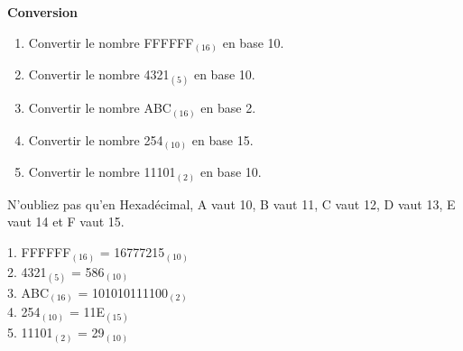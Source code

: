 \begin{Exercice}[10 minutes]  \textbf{Conversion }\\
    \begin{enumerate}
        \item Convertir le nombre FFFFFF$_{(16)}$ en base 10.
        \item Convertir le nombre 4321$_{(5)}$ en base 10.
        \item Convertir le nombre ABC$_{(16)}$ en base 2.
        \item Convertir le nombre 254$_{(10)}$ en base 15.
        \item Convertir le nombre 11101$_{(2)}$ en base 10.
    \end{enumerate}
    
        \begin{conseil}
            N'oubliez pas qu'en Hexadécimal, A vaut 10, B vaut 11, C vaut 12, D vaut 13, E vaut 14 et F vaut 15.
    \end{conseil}

    \begin{solution}
        1. FFFFFF$_{(16)}$ = 16777215$_{(10)}$\\
        2. 4321$_{(5)}$ = 586$_{(10)}$\\
        3. ABC$_{(16)}$ = 101010111100$_{(2)}$\\
        4. 254$_{(10)}$ = 11E$_{(15)}$\\
        5. 11101$_{(2)}$ = 29$_{(10)}$
    \end{solution}
\end{Exercice}

